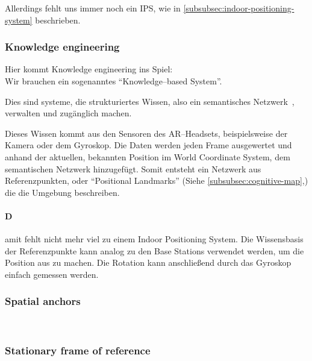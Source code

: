         Allerdings fehlt uns immer noch ein IPS, wie in \autoref{subsubsec:indoor-positioning-system} beschrieben.

    \subsubsection{Knowledge engineering}\label{subsubsec:knowledge-engineering}
        Hier kommt Knowledge engineering ins Spiel:\\
        Wir brauchen ein sogenanntes \enquote{Knowledge--based System}.~\autocite{wikipedia-contributors-2023C}

        Dies sind systeme, die strukturiertes Wissen, also ein semantisches Netzwerk~\autocite{wikipedia-contributors-2023K}, verwalten und zugänglich machen.

        Dieses Wissen kommt aus den Sensoren des AR--Headsets, beispielsweise der Kamera oder dem Gyroskop.
        Die Daten werden jeden Frame ausgewertet und anhand der aktuellen, bekannten Position im World Coordinate System, dem semantischen Netzwerk hinzugefügt.
        Somit entsteht ein Netzwerk aus Referenzpunkten, oder \enquote{Positional Landmarks} (Siehe \autoref{subsubsec:cognitive-map},) die die Umgebung beschreiben.

        \paragraph{D}amit fehlt nicht mehr viel zu einem Indoor Positioning System.
            Die Wissensbasis der Referenzpunkte kann analog zu den Base Stations verwendet werden, um die Position aus zu machen.
            Die Rotation kann anschließend durch das Gyroskop einfach gemessen werden.

    \subsubsection{Spatial anchors}\label{subsubsec:spatial-anchors}
        ~\autocite{thetuvix-2023B}

    \subsubsection{Stationary frame of reference}\label{subsubsec:stationary-frame-of-reference}
